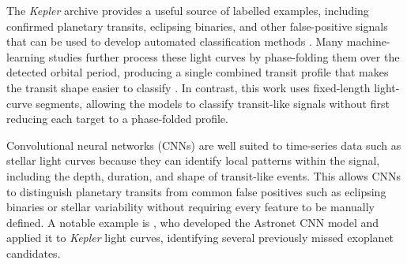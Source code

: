 The \textit{Kepler} archive provides a useful source of labelled examples, including confirmed planetary transits, eclipsing binaries, and other false-positive signals that can be used to develop automated classification methods \citep{2018ApJS..235...38T}. Many machine-learning studies further process these light curves by phase-folding them over the detected orbital period, producing a single combined transit profile that makes the transit shape easier to classify \citep{2018AJ....155...94S}. In contrast, this work uses fixed-length light-curve segments, allowing the models to classify transit-like signals without first reducing each target to a phase-folded profile.

Convolutional neural networks (CNNs) are well suited to time-series data such as stellar light curves because they can identify local patterns within the signal, including the depth, duration, and shape of transit-like events. This allows CNNs to distinguish planetary transits from common false positives such as eclipsing binaries or stellar variability without requiring every feature to be manually defined. A notable example is \citet{2018AJ....155...94S}, who developed the Astronet CNN model and applied it to \textit{Kepler} light curves, identifying several previously missed exoplanet candidates.

